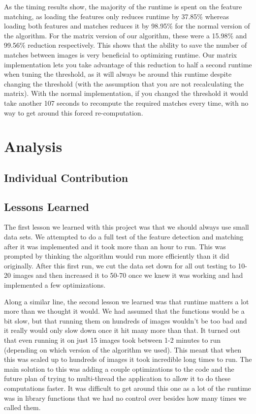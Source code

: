 \documentclass[12pt]{article}
\begin{document}
	As the timing results show, the majority of the runtime is spent on the feature matching, as loading the features only reduces runtime by 37.85\% whereas loading both features and matches reduces it by 98.95\% for the normal version of the algorithm. For the matrix version of our algorithm, these were a 15.98\% and 99.56\% reduction respectively. This shows that the ability to save the number of matches between images is very beneficial to optimizing runtime. Our matrix implementation lets you take advantage of this reduction to half a second runtime when tuning the threshold, as it will always be around this runtime despite changing the threshold (with the assumption that you are not recalculating the matrix). With the normal implementation, if you changed the threshold it would take another 107 seconds to recompute the required matches every time, with no way to get around this forced re-computation.


\section{Analysis}

\subsection{Individual Contribution}
	

\subsection{Lessons Learned}
	The first lesson we learned with this project was that we should always use small data sets. We attempted to do a full test of the feature detection and matching after it was implemented and it took more than an hour to run. This was prompted by thinking the algorithm would run more efficiently than it did originally. After this first run, we cut the data set down for all out testing to 10-20 images and then increased it to 50-70 once we knew it was working and had implemented a few optimizations.
	
	Along a similar line, the second lesson we learned was that runtime matters a lot more than we thought it would. We had assumed that the functions would be a bit slow, but that running them on hundreds of images wouldn't be too bad and it really would only slow down once it hit many more than that. It turned out that even running it on just 15 images took between 1-2 minutes to run (depending on which version of the algorithm we used). This meant that when this was scaled up to hundreds of images it took incredible long times to run. The main solution to this was adding a couple optimizations to the code and the future plan of trying to multi-thread the application to allow it to do these computations faster. It was difficult to get around this one as a lot of the runtime was in library functions that we had no control over besides how many times we called them.
	
\end{document}
